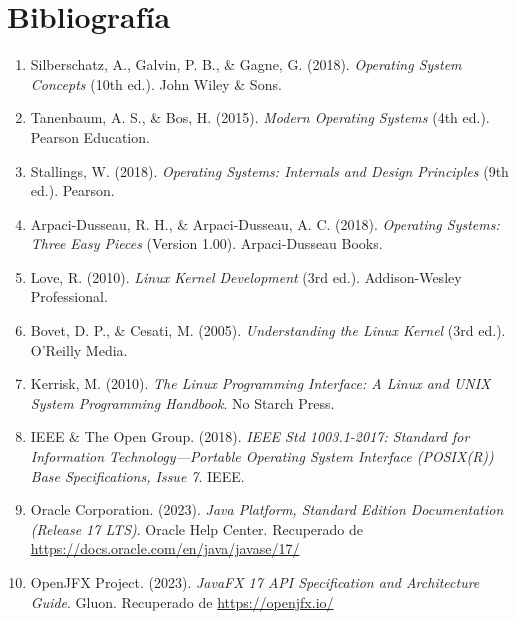 \documentclass[11pt,letterpaper]{article}
\begin{document}
\section{Bibliografía}

\begin{enumerate}
    \item Silberschatz, A., Galvin, P. B., \& Gagne, G. (2018). \textit{Operating System Concepts} (10th ed.). John Wiley \& Sons.
    \item Tanenbaum, A. S., \& Bos, H. (2015). \textit{Modern Operating Systems} (4th ed.). Pearson Education.
    \item Stallings, W. (2018). \textit{Operating Systems: Internals and Design Principles} (9th ed.). Pearson.
    \item Arpaci-Dusseau, R. H., \& Arpaci-Dusseau, A. C. (2018). \textit{Operating Systems: Three Easy Pieces} (Version 1.00). Arpaci-Dusseau Books.
    \item Love, R. (2010). \textit{Linux Kernel Development} (3rd ed.). Addison-Wesley Professional.
    \item Bovet, D. P., \& Cesati, M. (2005). \textit{Understanding the Linux Kernel} (3rd ed.). O'Reilly Media.
    \item Kerrisk, M. (2010). \textit{The Linux Programming Interface: A Linux and UNIX System Programming Handbook}. No Starch Press.
    \item IEEE \& The Open Group. (2018). \textit{IEEE Std 1003.1-2017: Standard for Information Technology---Portable Operating System Interface (POSIX(R)) Base Specifications, Issue 7}. IEEE.
    \item Oracle Corporation. (2023). \textit{Java Platform, Standard Edition Documentation (Release 17 LTS)}. Oracle Help Center. Recuperado de \url{https://docs.oracle.com/en/java/javase/17/}
    \item OpenJFX Project. (2023). \textit{JavaFX 17 API Specification and Architecture Guide}. Gluon. Recuperado de \url{https://openjfx.io/}
\end{enumerate}
\end{document}
